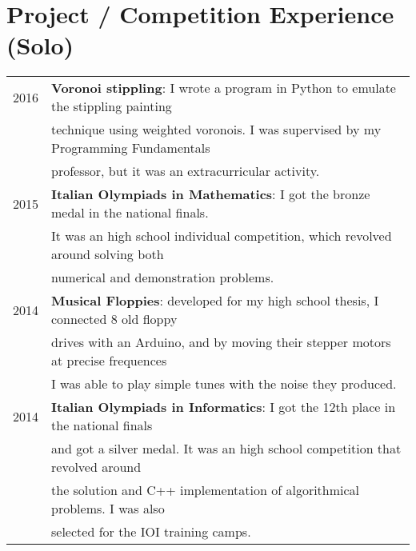 \documentclass[a4paper,10pt]{article} %
\begin{document}
\section{Project / Competition Experience (Solo)}
\begin{tabular}{rl}
2016 & \textbf{Voronoi stippling}: I wrote a program in Python to emulate the stippling painting \\
     & technique using weighted voronois. I was supervised by my Programming Fundamentals \\
     & professor, but it was an extracurricular activity. \\
2015 & \textbf{Italian Olympiads in Mathematics}: I got the bronze medal in the national finals. \\
     & It was an high school individual competition, which revolved around solving both \\
     & numerical and demonstration problems. \\
2014 &  \textbf{Musical Floppies}: developed for my high school thesis, I connected 8 old floppy \\
     & drives with an Arduino, and by moving their stepper motors at precise frequences \\
     & I was able to play simple tunes with the noise they produced.\\
2014 &  \textbf{Italian Olympiads in Informatics}: I got the 12th place in the national finals \\
     & and got a silver medal. It was an high school competition that revolved around \\
     & the solution and C++ implementation of algorithmical problems. I was also \\
     & selected for the IOI training camps. \\
\end{tabular}

\end{document}
